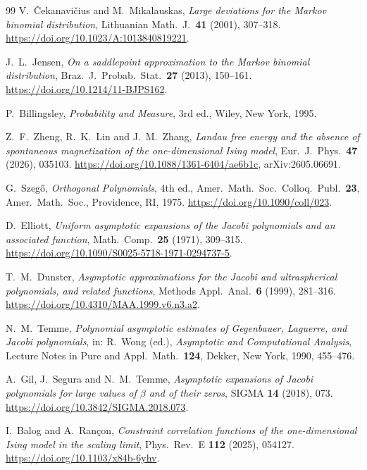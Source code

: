 \documentclass[11pt]{article}
\theoremstyle{definition}
\theoremstyle{remark}
\begin{document}
\begin{thebibliography}{99}
V.~\v{C}ekanavi\v{c}ius and M.~Mikalauskas,
\emph{Large deviations for the Markov binomial distribution},
Lithuanian Math.~J.~\textbf{41} (2001), 307--318.
\url{https://doi.org/10.1023/A:1013840819221}.

J.~L.~Jensen, \emph{On a saddlepoint approximation to the Markov binomial
distribution}, Braz.\ J.\ Probab.\ Stat.\ \textbf{27} (2013), 150--161.
\url{https://doi.org/10.1214/11-BJPS162}.

P.~Billingsley, \emph{Probability and Measure}, 3rd ed., Wiley, New York, 1995.

Z.~F.~Zheng, R.~K.~Lin and J.~M.~Zhang, \emph{Landau free energy and the
absence of spontaneous magnetization of the one-dimensional Ising model},
Eur.\ J.\ Phys.\ \textbf{47} (2026), 035103.
\url{https://doi.org/10.1088/1361-6404/ae6b1c}, arXiv:2605.06691.

G.~Szeg\H{o}, \emph{Orthogonal Polynomials}, 4th ed., Amer.\ Math.\ Soc.\
Colloq.\ Publ.\ \textbf{23}, Amer.\ Math.\ Soc., Providence, RI, 1975.
\url{https://doi.org/10.1090/coll/023}.

D.~Elliott, \emph{Uniform asymptotic expansions of the Jacobi polynomials and an associated
function}, Math.\ Comp.\ \textbf{25} (1971), 309--315.
\url{https://doi.org/10.1090/S0025-5718-1971-0294737-5}.

T.~M.~Dunster, \emph{Asymptotic approximations for the Jacobi and
ultraspherical polynomials, and related functions}, Methods Appl.\ Anal.\
\textbf{6} (1999), 281--316.
\url{https://doi.org/10.4310/MAA.1999.v6.n3.a2}.

N.~M.~Temme, \emph{Polynomial asymptotic estimates of Gegenbauer, Laguerre, and Jacobi
polynomials}, in: R.~Wong (ed.), \emph{Asymptotic and Computational Analysis}, Lecture Notes in
Pure and Appl.\ Math.\ \textbf{124}, Dekker, New York, 1990, 455--476.

\bibitem{gil2018}
A.~Gil, J.~Segura and N.~M.~Temme, \emph{Asymptotic expansions of Jacobi
polynomials for large values of $\beta$ and of their zeros}, SIGMA
\textbf{14} (2018), 073.
\url{https://doi.org/10.3842/SIGMA.2018.073}.

I.~Balog and A.~Ran\c{c}on, \emph{Constraint correlation functions of the
one-dimensional Ising model in the scaling limit}, Phys.~Rev.~E \textbf{112}
(2025), 054127.
\url{https://doi.org/10.1103/x84b-6yhv}.


\end{thebibliography}
\end{document}
